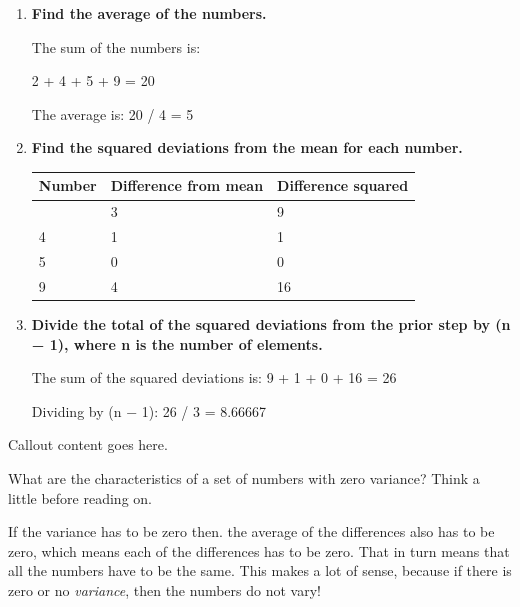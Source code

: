 \documentclass[
  12pt,
  letterpaper,
  DIV=11,
  numbers=noendperiod]{scrreprt}
\begin{document}
\begin{enumerate}
\def\labelenumi{\arabic{enumi}.}
\item
  \textbf{Find the average of the numbers.}

  The sum of the numbers is:

  2 + 4 + 5 + 9 = 20

  The average is: 20 / 4 = 5
\item
  \textbf{Find the squared deviations from the mean for each number.}

  \begin{longtable}[]{@{}lll@{}}
  \toprule\noalign{}
  Number & Difference from mean & Difference squared \\
  \midrule\noalign{}
  \endhead
  \bottomrule\noalign{}
  \endlastfoot
  2 & 3 & 9 \\
  4 & 1 & 1 \\
  5 & 0 & 0 \\
  9 & 4 & 16 \\
  \end{longtable}
\item
  \textbf{Divide the total of the squared deviations from the prior step
  by (n − 1), where n is the number of elements.}

  The sum of the squared deviations is: 9 + 1 + 0 + 16 = 26

  Dividing by (n − 1): 26 / 3 = 8.66667
\end{enumerate}

\begin{tcolorbox}[enhanced jigsaw, colback=white, leftrule=.75mm, toprule=.15mm, bottomtitle=1mm, breakable, coltitle=black, toptitle=1mm, title=\textcolor{quarto-callout-important-color}{\faExclamation}\hspace{0.5em}{Zero variance?}, opacitybacktitle=0.6, colbacktitle=quarto-callout-important-color!10!white, arc=.35mm, left=2mm, colframe=quarto-callout-important-color-frame, titlerule=0mm, rightrule=.15mm, bottomrule=.15mm, opacityback=0]

Callout content goes here.

\end{tcolorbox}

What are the characteristics of a set of numbers with zero variance?
Think a little before reading on.

If the variance has to be zero then. the average of the differences also
has to be zero, which means each of the differences has to be zero. That
in turn means that all the numbers have to be the same. This makes a lot
of sense, because if there is zero or no \emph{variance}, then the
numbers do not vary!
\end{document}
